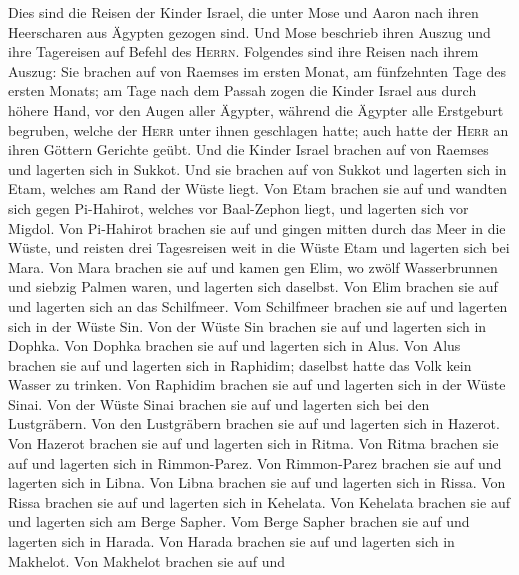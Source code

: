  Dies sind die Reisen der Kinder Israel, die unter Mose
und Aaron nach ihren Heerscharen aus Ägypten gezogen sind.
 Und Mose beschrieb ihren Auszug und ihre Tagereisen auf
Befehl des \textsc{Herrn}. Folgendes sind ihre Reisen nach ihrem Auszug:
 Sie brachen auf von Raemses im ersten Monat, am
fünfzehnten Tage des ersten Monats; am Tage nach dem Passah zogen die
Kinder Israel aus durch höhere Hand, vor den Augen aller Ägypter,
 während die Ägypter alle Erstgeburt begruben, welche der
\textsc{Herr} unter ihnen geschlagen hatte; auch hatte der \textsc{Herr}
an ihren Göttern Gerichte geübt.  Und die Kinder Israel
brachen auf von Raemses und lagerten sich in Sukkot.  Und
sie brachen auf von Sukkot und lagerten sich in Etam, welches am Rand
der Wüste liegt.  Von Etam brachen sie auf und wandten
sich gegen Pi-Hahirot, welches vor Baal-Zephon liegt, und lagerten sich
vor Migdol.  Von Pi-Hahirot brachen sie auf und gingen
mitten durch das Meer in die Wüste, und reisten drei Tagesreisen weit in
die Wüste Etam und lagerten sich bei Mara.  Von Mara
brachen sie auf und kamen gen Elim, wo zwölf Wasserbrunnen und siebzig
Palmen waren, und lagerten sich daselbst.  Von Elim
brachen sie auf und lagerten sich an das Schilfmeer.  Vom
Schilfmeer brachen sie auf und lagerten sich in der Wüste Sin.
 Von der Wüste Sin brachen sie auf und lagerten sich in
Dophka.  Von Dophka brachen sie auf und lagerten sich in
Alus.  Von Alus brachen sie auf und lagerten sich in
Raphidim; daselbst hatte das Volk kein Wasser zu trinken.
 Von Raphidim brachen sie auf und lagerten sich in der
Wüste Sinai.  Von der Wüste Sinai brachen sie auf und
lagerten sich bei den Lustgräbern.  Von den Lustgräbern
brachen sie auf und lagerten sich in Hazerot.  Von
Hazerot brachen sie auf und lagerten sich in Ritma.  Von
Ritma brachen sie auf und lagerten sich in Rimmon-Parez. 
Von Rimmon-Parez brachen sie auf und lagerten sich in Libna.
 Von Libna brachen sie auf und lagerten sich in Rissa.
 Von Rissa brachen sie auf und lagerten sich in Kehelata.
 Von Kehelata brachen sie auf und lagerten sich am Berge
Sapher.  Vom Berge Sapher brachen sie auf und lagerten
sich in Harada.  Von Harada brachen sie auf und lagerten
sich in Makhelot.  Von Makhelot brachen sie auf und
